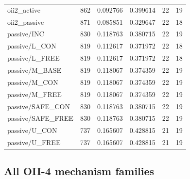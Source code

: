 \begin{longtable}{lrrrrr}
oii2\_active & 862 & 0.092766 & 0.399614 & 22 & 19 \\
oii2\_passive & 871 & 0.085851 & 0.329647 & 22 & 18 \\
passive/INC & 830 & 0.118763 & 0.380715 & 22 & 19 \\
passive/L\_CON & 819 & 0.112617 & 0.371972 & 22 & 18 \\
passive/L\_FREE & 819 & 0.112617 & 0.371972 & 22 & 18 \\
passive/M\_BASE & 819 & 0.118067 & 0.374359 & 22 & 19 \\
passive/M\_CON & 819 & 0.118067 & 0.374359 & 22 & 19 \\
passive/M\_FREE & 819 & 0.118067 & 0.374359 & 22 & 19 \\
passive/SAFE\_CON & 830 & 0.118763 & 0.380715 & 22 & 19 \\
passive/SAFE\_FREE & 830 & 0.118763 & 0.380715 & 22 & 19 \\
passive/U\_CON & 737 & 0.165607 & 0.428815 & 21 & 19 \\
passive/U\_FREE & 737 & 0.165607 & 0.428815 & 21 & 19 \\
\bottomrule
\end{longtable}
\endgroup



\subsection{All OII-4 mechanism families}

